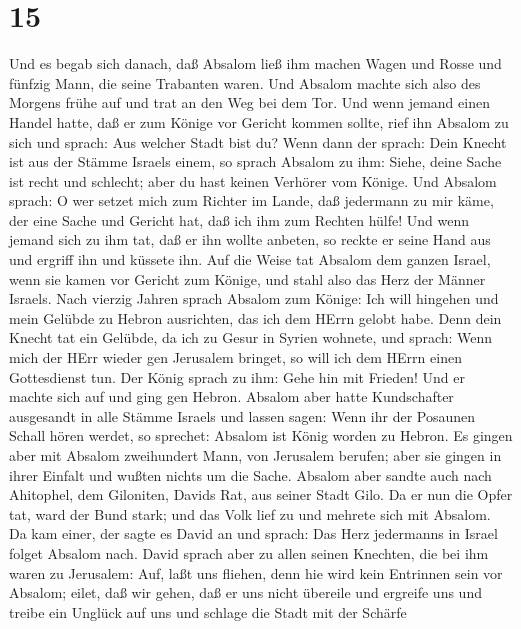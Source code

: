 \hypertarget{section-14}{%
\section{15}\label{section-14}}

 Und es begab sich danach, daß Absalom ließ ihm machen Wagen
und Rosse und fünfzig Mann, die seine Trabanten waren.  Und
Absalom machte sich also des Morgens frühe auf und trat an den Weg bei
dem Tor. Und wenn jemand einen Handel hatte, daß er zum Könige vor
Gericht kommen sollte, rief ihn Absalom zu sich und sprach: Aus welcher
Stadt bist du? Wenn dann der sprach: Dein Knecht ist aus der Stämme
Israels einem,  so sprach Absalom zu ihm: Siehe, deine Sache
ist recht und schlecht; aber du hast keinen Verhörer vom Könige.
 Und Absalom sprach: O wer setzet mich zum Richter im Lande,
daß jedermann zu mir käme, der eine Sache und Gericht hat, daß ich ihm
zum Rechten hülfe!  Und wenn jemand sich zu ihm tat, daß er
ihn wollte anbeten, so reckte er seine Hand aus und ergriff ihn und
küssete ihn.  Auf die Weise tat Absalom dem ganzen Israel,
wenn sie kamen vor Gericht zum Könige, und stahl also das Herz der
Männer Israels.  Nach vierzig Jahren sprach Absalom zum
Könige: Ich will hingehen und mein Gelübde zu Hebron ausrichten, das ich
dem HErrn gelobt habe.  Denn dein Knecht tat ein Gelübde, da
ich zu Gesur in Syrien wohnete, und sprach: Wenn mich der HErr wieder
gen Jerusalem bringet, so will ich dem HErrn einen Gottesdienst tun.
 Der König sprach zu ihm: Gehe hin mit Frieden! Und er
machte sich auf und ging gen Hebron.  Absalom aber hatte
Kundschafter ausgesandt in alle Stämme Israels und lassen sagen: Wenn
ihr der Posaunen Schall hören werdet, so sprechet: Absalom ist König
worden zu Hebron.  Es gingen aber mit Absalom zweihundert
Mann, von Jerusalem berufen; aber sie gingen in ihrer Einfalt und wußten
nichts um die Sache.  Absalom aber sandte auch nach
Ahitophel, dem Giloniten, Davids Rat, aus seiner Stadt Gilo. Da er nun
die Opfer tat, ward der Bund stark; und das Volk lief zu und mehrete
sich mit Absalom.  Da kam einer, der sagte es David an und
sprach: Das Herz jedermanns in Israel folget Absalom nach. 
David sprach aber zu allen seinen Knechten, die bei ihm waren zu
Jerusalem: Auf, laßt uns fliehen, denn hie wird kein Entrinnen sein vor
Absalom; eilet, daß wir gehen, daß er uns nicht übereile und ergreife
uns und treibe ein Unglück auf uns und schlage die Stadt mit der Schärfe
